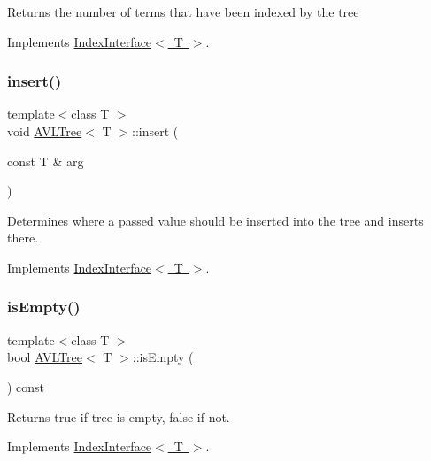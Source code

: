 Returns the number of terms that have been indexed by the tree 

Implements \mbox{\hyperlink{classIndexInterface}{Index\+Interface$<$ T $>$}}.

\mbox{\label{classAVLTree_a5b8d9bac5800aec72c175c74391f7027}} 
\subsubsection{\texorpdfstring{insert()}{insert()}}
{\footnotesize\ttfamily template$<$class T $>$ \\
void \mbox{\hyperlink{classAVLTree}{A\+V\+L\+Tree}}$<$ T $>$\+::insert (\begin{DoxyParamCaption}\item[{const T \&}]{arg }\end{DoxyParamCaption})\hspace{0.3cm}{\ttfamily [virtual]}}

Determines where a passed value should be inserted into the tree and inserts there. 

Implements \mbox{\hyperlink{classIndexInterface}{Index\+Interface$<$ T $>$}}.

\mbox{\label{classAVLTree_a0203b5672172acbb9085d75f37fb674e}} 
\subsubsection{\texorpdfstring{is\+Empty()}{isEmpty()}}
{\footnotesize\ttfamily template$<$class T $>$ \\
bool \mbox{\hyperlink{classAVLTree}{A\+V\+L\+Tree}}$<$ T $>$\+::is\+Empty (\begin{DoxyParamCaption}{ }\end{DoxyParamCaption}) const\hspace{0.3cm}{\ttfamily [virtual]}}

Returns true if tree is empty, false if not. 

Implements \mbox{\hyperlink{classIndexInterface}{Index\+Interface$<$ T $>$}}.

\mbox{\label{classAVLTree_ab7062b17bcc409f0b9200671482fad01}} 
